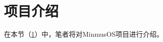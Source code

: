 \section{项目介绍}\label{sec:ProjectIntroduction}

在本节（\cref{sec:ProjectIntroduction}）中，笔者将对MinmusOS项目进行介绍。